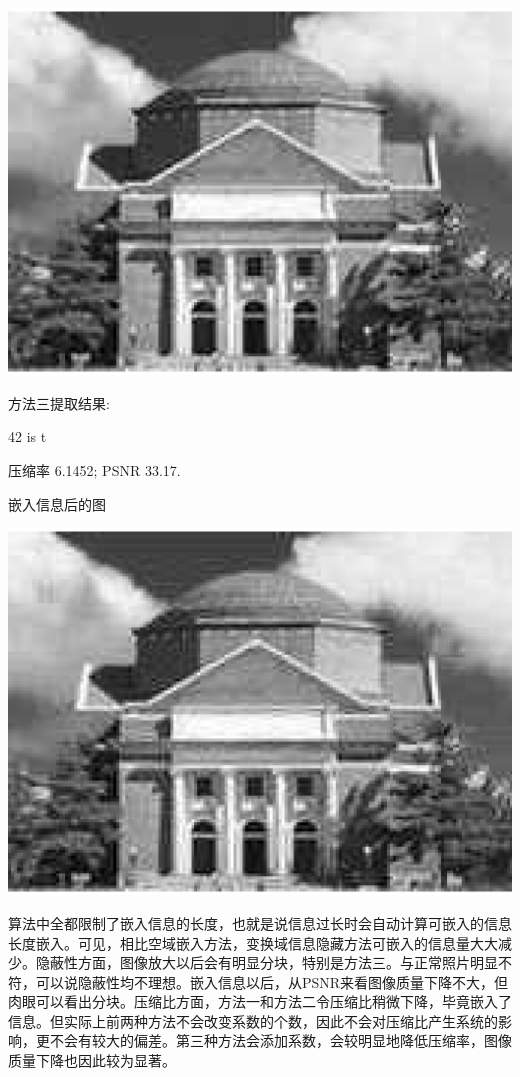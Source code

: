 \documentclass{article}
\begin{document}
\begin{center}\includegraphics[width=\textwidth]{hidden2.eps}\end{center}
\par 方法三提取结果:
\par 	42 is t
\par 压缩率 6.1452; PSNR 33.17.
\par 嵌入信息后的图
\begin{center}\includegraphics[width=\textwidth]{hidden3.eps}\end{center}
\par 算法中全都限制了嵌入信息的长度，也就是说信息过长时会自动计算可嵌入的信息长度嵌入。可见，相比空域嵌入方法，变换域信息隐藏方法可嵌入的信息量大大减少。隐蔽性方面，图像放大以后会有明显分块，特别是方法三。与正常照片明显不符，可以说隐蔽性均不理想。嵌入信息以后，从PSNR来看图像质量下降不大，但肉眼可以看出分块。压缩比方面，方法一和方法二令压缩比稍微下降，毕竟嵌入了信息。但实际上前两种方法不会改变系数的个数，因此不会对压缩比产生系统的影响，更不会有较大的偏差。第三种方法会添加系数，会较明显地降低压缩率，图像质量下降也因此较为显著。
\end{document}
